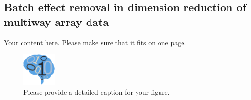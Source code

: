 \documentclass[simplex.tex]{subfiles}
\begin{document}
\subsection{Batch effect removal in dimension reduction of multiway array data}
Your content here. Please make sure that it fits on one page.

\begin{figure}[!h]
\begin{cframed}
\centering
\includegraphics[width=0.15\textwidth]{neurodata_small.png}
\caption{Please provide a detailed caption for your figure.}
\label{fig:name}
\end{cframed}
\end{figure}
%
%
%
\end{document}
